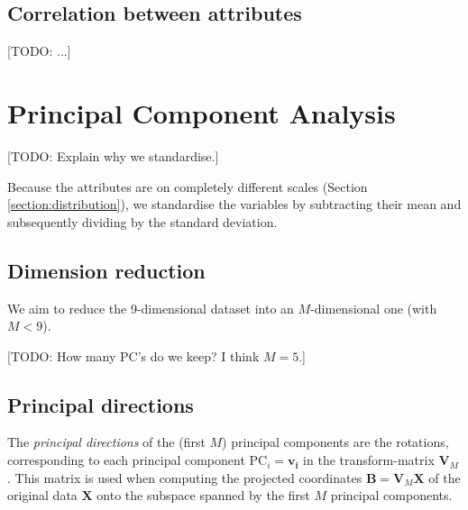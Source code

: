 \documentclass[dtu]{dtuarticle}
\newcommand{\todo}[1]{\color{red}[TODO: #1]\color{black}}
\begin{document}
	\subsection{Correlation between attributes}

	\todo{...}

	\section{Principal Component Analysis}

	\todo{Explain why we standardise.}

	Because the attributes are on completely different scales (Section \ref{section:distribution}), we standardise the variables by subtracting their mean and subsequently dividing by the standard deviation.

	\subsection{Dimension reduction}

	We aim to reduce the 9-dimensional dataset into an $M$-dimensional one (with $M < 9$).

	\todo{How many PC's do we keep? I think $M=5$.}

	\subsection{Principal directions}

	The \textit{principal directions} of the (first $M$) principal components are the rotations, corresponding to each principal component $\text{PC}_i = \bm{v_i}$ in the transform-matrix $\bm{V}_M$. This matrix is used when computing the projected coordinates $\bm{B} = \bm{V}_M \bm{X}$ of the original data $\bm{X}$ onto the subspace spanned by the first $M$ principal components.
\end{document}
